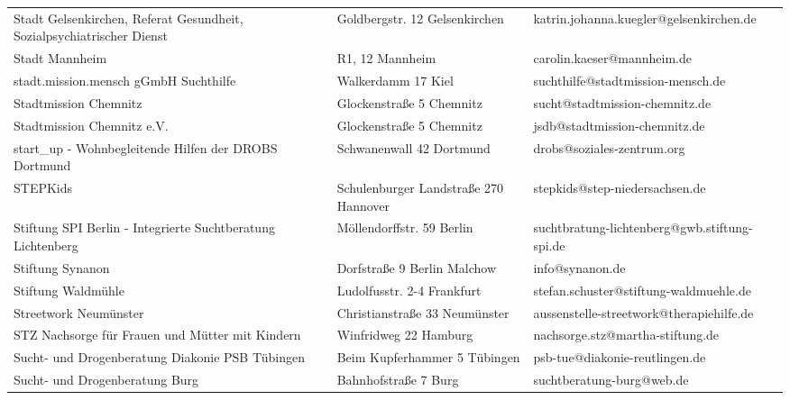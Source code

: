 {\begin{xltabular}{\textwidth} {
 >{\raggedright\arraybackslash}p{5cm}
 >{\raggedright\arraybackslash}X
 >{\raggedright\arraybackslash}p{5cm} }
Stadt Gelsenkirchen, Referat Gesundheit, Sozialpsychiatrischer Dienst & Goldbergstr. 12 Gelsenkirchen & katrin.johanna.kuegler@gelsenkirchen.de \\
Stadt Mannheim & R1, 12 Mannheim & carolin.kaeser@mannheim.de \\
stadt.mission.mensch gGmbH Suchthilfe & Walkerdamm 17 Kiel & suchthilfe@stadtmission-mensch.de \\
Stadtmission Chemnitz & Glockenstraße 5 Chemnitz & sucht@stadtmission-chemnitz.de \\
Stadtmission Chemnitz e.V. & Glockenstraße 5 Chemnitz & jsdb@stadtmission-chemnitz.de \\
start\_up - Wohnbegleitende Hilfen der DROBS Dortmund & Schwanenwall 42 Dortmund & drobs@soziales-zentrum.org \\
STEPKids & Schulenburger Landstraße 270 Hannover & stepkids@step-niedersachsen.de \\
Stiftung SPI Berlin - Integrierte Suchtberatung Lichtenberg & Möllendorffstr. 59 Berlin & suchtbratung-lichtenberg@gwb.stiftung-spi.de \\
Stiftung Synanon & Dorfstraße 9 Berlin Malchow & info@synanon.de \\
Stiftung Waldmühle & Ludolfusstr. 2-4 Frankfurt & stefan.schuster@stiftung-waldmuehle.de \\
Streetwork Neumünster & Christianstraße 33 Neumünster & aussenstelle-streetwork@therapiehilfe.de \\
STZ Nachsorge für Frauen und Mütter mit Kindern & Winfridweg 22 Hamburg & nachsorge.stz@martha-stiftung.de \\
Sucht- und Drogenberatung Diakonie PSB Tübingen & Beim Kupferhammer 5 Tübingen & psb-tue@diakonie-reutlingen.de \\
Sucht- und Drogenberatung Burg & Bahnhofstraße 7 Burg & suchtberatung-burg@web.de \\

\end{xltabular}}
